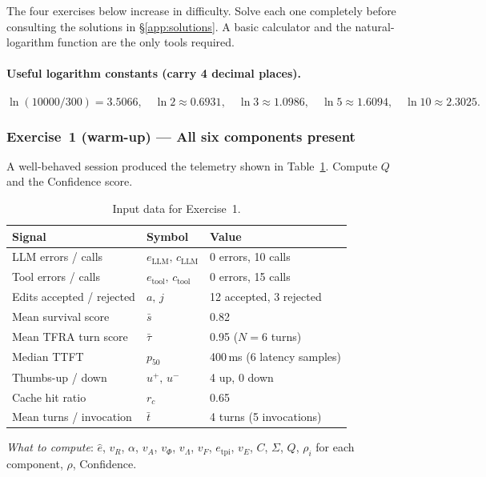 \documentclass[11pt,a4paper]{article}
\begin{document}
The four exercises below increase in difficulty.  Solve each one completely
before consulting the solutions in \S\ref{app:solutions}.  A basic calculator
and the natural-logarithm function are the only tools required.

\paragraph{Useful logarithm constants (carry 4 decimal places).}
\[
  \ln(10000/300) = 3.5066,\quad
  \ln 2 \approx 0.6931,\quad
  \ln 3 \approx 1.0986,\quad
  \ln 5 \approx 1.6094,\quad
  \ln 10 \approx 2.3025.
\]

\subsubsection*{Exercise~1 \textmd{(warm-up)} --- All six components present}
\label{app:ex1}

A well-behaved session produced the telemetry shown in
Table~\ref{tab:ex1-input}.  Compute $Q$ and the Confidence score.

\begin{table}[h!]
\centering
\caption{Input data for Exercise~1.}
\label{tab:ex1-input}
\begin{tabular}{@{}lll@{}}
\toprule
Signal & Symbol & Value \\
\midrule
LLM errors / calls & $e_{\text{LLM}},\,c_{\text{LLM}}$ & 0 errors, 10 calls \\
Tool errors / calls & $e_{\text{tool}},\,c_{\text{tool}}$ & 0 errors, 15 calls \\
Edits accepted / rejected & $a,\,j$ & 12 accepted, 3 rejected \\
Mean survival score & $\bar{s}$ & 0.82 \\
Mean TFRA turn score & $\bar{\tau}$ & 0.95 \hfill($N=6$ turns) \\
Median TTFT & $p_{50}$ & 400\,ms \hfill(6 latency samples) \\
Thumbs-up / down & $u^+,\,u^-$ & 4 up, 0 down \\
Cache hit ratio & $r_c$ & 0.65 \\
Mean turns / invocation & $\bar{t}$ & 4 turns \hfill(5 invocations) \\
\bottomrule
\end{tabular}
\end{table}

\noindent\emph{What to compute}: $\hat{e}$, $v_R$, $\alpha$, $v_A$,
$v_\Phi$, $v_\Lambda$, $v_F$, $e_{\mathrm{tpi}}$, $v_E$, $C$, $\Sigma$,
$Q$, $\rho_i$ for each component, $\rho$, Confidence.
\end{document}
